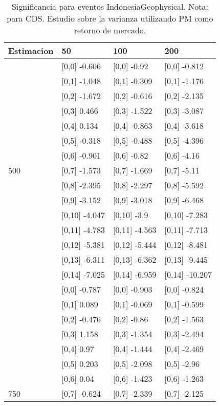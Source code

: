 \begin{table}

\caption{Significancia para eventos IndonesiaGeophysical. Nota: para CDS. Estudio sobre la varianza utilizando PM como retorno de mercado.}
\centering
\begin{tabular}[t]{llll}
\toprule
Estimacion & 50 & 100 & 200\\
\midrule
 & {}[0,0] -0.606 & {}[0,0] -0.92 & {}[0,0] -0.812\\
 & {}[0,1] -1.048 & {}[0,1] -0.309 & {}[0,1] -1.176\\
 & {}[0,2] -1.672 & {}[0,2] -0.616 & {}[0,2] -2.135\\
 & {}[0,3] 0.466 & {}[0,3] -1.522 & {}[0,3] -3.087\\
 & {}[0,4] 0.134 & {}[0,4] -0.863 & {}[0,4] -3.618\\
\addlinespace
 & {}[0,5] -0.318 & {}[0,5] -0.488 & {}[0,5] -4.396\\
 & {}[0,6] -0.901 & {}[0,6] -0.82 & {}[0,6] -4.16\\
500 & {}[0,7] -1.573 & {}[0,7] -1.669 & {}[0,7] -5.11\\
 & {}[0,8] -2.395 & {}[0,8] -2.297 & {}[0,8] -5.592\\
 & {}[0,9] -3.152 & {}[0,9] -3.018 & {}[0,9] -6.468\\
\addlinespace
 & {}[0,10] -4.047 & {}[0,10] -3.9 & {}[0,10] -7.283\\
 & {}[0,11] -4.783 & {}[0,11] -4.563 & {}[0,11] -7.713\\
 & {}[0,12] -5.381 & {}[0,12] -5.444 & {}[0,12] -8.481\\
 & {}[0,13] -6.311 & {}[0,13] -6.362 & {}[0,13] -9.445\\
 & {}[0,14] -7.025 & {}[0,14] -6.959 & {}[0,14] -10.207\\
\addlinespace
 & {}[0,0] -0.787 & {}[0,0] -0.903 & {}[0,0] -0.824\\
 & {}[0,1] 0.089 & {}[0,1] -0.069 & {}[0,1] -0.599\\
 & {}[0,2] -0.476 & {}[0,2] -0.86 & {}[0,2] -1.563\\
 & {}[0,3] 1.158 & {}[0,3] -1.354 & {}[0,3] -2.494\\
 & {}[0,4] 0.97 & {}[0,4] -1.444 & {}[0,4] -2.469\\
\addlinespace
 & {}[0,5] 0.203 & {}[0,5] -2.098 & {}[0,5] -2.96\\
 & {}[0,6] 0.04 & {}[0,6] -1.423 & {}[0,6] -1.263\\
750 & {}[0,7] -0.624 & {}[0,7] -2.339 & {}[0,7] -2.125\\

\end{tabular}
\end{table}

